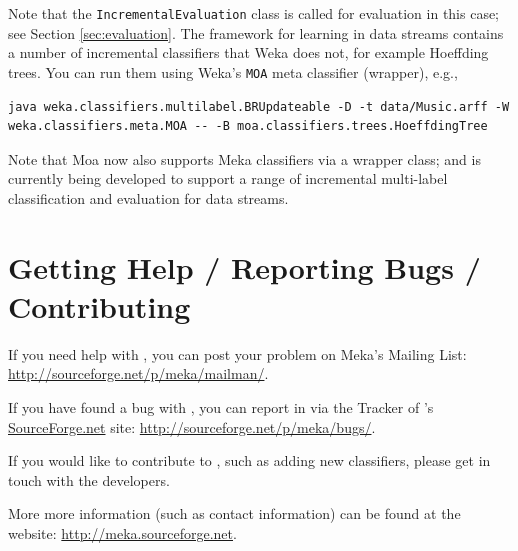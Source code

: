 \documentclass[11pt]{article}
\newcommand{\MEKA}{Meka}
\newcommand{\MOA}{Moa}
\newcommand{\WEKA}{Weka}
\begin{document}
Note that the \texttt{IncrementalEvaluation} class is called for evaluation in this case; see Section \ref{sec:evaluation}. The \framework{\MOA} framework \cite{MOA} for learning in data streams contains a number of incremental classifiers that \WEKA{} does not, for example Hoeffding trees. You can run them using \WEKA's \texttt{MOA} meta classifier (wrapper), e.g., 
\begin{verbatim}
java weka.classifiers.multilabel.BRUpdateable -D -t data/Music.arff -W weka.classifiers.meta.MOA -- -B moa.classifiers.trees.HoeffdingTree
\end{verbatim}

Note that \MOA{} now also supports \MEKA{} classifiers via a wrapper class; and is currently being developed to support a range of incremental multi-label classification and evaluation for data streams.

\section{Getting Help / Reporting Bugs / Contributing}

If you need help with \framework{\MEKA}, you can post your problem on \MEKA's \textsf{Mailing List}: \url{http://sourceforge.net/p/meka/mailman/}.

If you have found a bug with \framework{\MEKA}, you can report in via the \textsf{Tracker}  of \framework{\MEKA}'s \url{SourceForge.net} site: \url{http://sourceforge.net/p/meka/bugs/}.

If you would like to contribute to \framework{\MEKA}, such as adding new classifiers, please get in touch with the developers.

More more information (such as contact information) can be found at the \framework{\MEKA} website:
\url{http://meka.sourceforge.net}.


\end{document}
